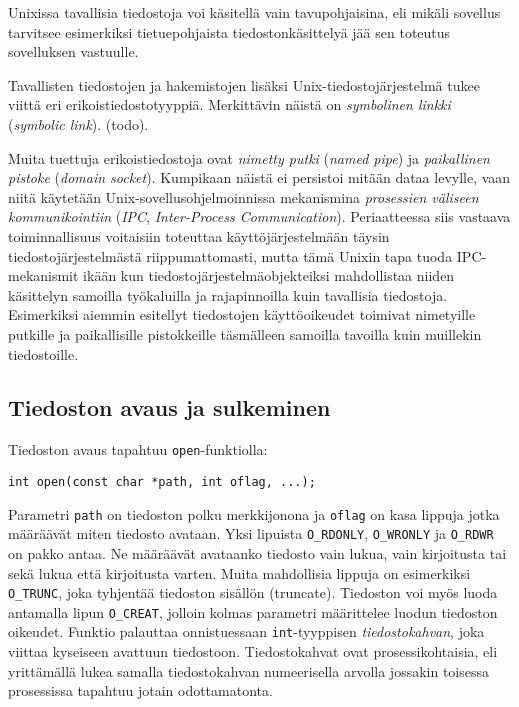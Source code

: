 Unixissa tavallisia tiedostoja voi käsitellä vain tavupohjaisina,
eli mikäli sovellus tarvitsee esimerkiksi tietuepohjaista tiedostonkäsittelyä jää sen toteutus sovelluksen vastuulle.

Tavallisten tiedostojen ja hakemistojen lisäksi Unix-tiedostojärjestelmä tukee viittä eri erikoistiedostotyyppiä.
Merkittävin näistä on \emph{symbolinen linkki} (\emph{symbolic link}). (todo).

Muita tuettuja erikoistiedostoja ovat \emph{nimetty putki} (\emph{named pipe}) ja \emph{paikallinen pistoke} (\emph{domain socket}).
Kumpikaan näistä ei persistoi mitään dataa levylle,
vaan niitä käytetään Unix-sovellusohjelmoinnissa mekanismina \emph{prosessien väliseen kommunikointiin} (\emph{IPC}, \emph{Inter-Process Communication}).
Periaatteessa siis vastaava toiminnallisuus voitaisiin toteuttaa käyttöjärjestelmään täysin tiedostojärjestelmästä riippumattomasti,
mutta tämä Unixin tapa tuoda IPC-mekanismit ikään kun tiedostojärjestelmäobjekteiksi mahdollistaa niiden käsittelyn samoilla työkaluilla ja rajapinnoilla kuin tavallisia tiedostoja.
Esimerkiksi aiemmin esitellyt tiedostojen käyttöoikeudet toimivat nimetyille putkille ja paikallisille pistokkeille täsmälleen samoilla tavoilla kuin muillekin tiedostoille.

\subsection{Tiedoston avaus ja sulkeminen}
Tiedoston avaus tapahtuu \texttt{open}-funktiolla:

\begin{verbatim}
int open(const char *path, int oflag, ...);
\end{verbatim}
%
Parametri \texttt{path} on tiedoston polku merkkijonona
ja \texttt{oflag} on kasa lippuja jotka määräävät miten tiedosto avataan.
Yksi lipuista \texttt{O\_RDONLY}, \texttt{O\_WRONLY} ja \texttt{O\_RDWR} on pakko antaa.
Ne määräävät avataanko tiedosto vain lukua, vain kirjoitusta tai sekä lukua että
kirjoitusta varten.
Muita mahdollisia lippuja on esimerkiksi \texttt{O\_TRUNC},
joka tyhjentää tiedoston sisällön (truncate).
Tiedoston voi myös luoda antamalla lipun \texttt{O\_CREAT},
jolloin kolmas parametri määrittelee luodun tiedoston oikeudet.
Funktio palauttaa onnistuessaan \texttt{int}-tyyppisen \emph{tiedostokahvan},
joka viittaa kyseiseen avattuun tiedostoon.
Tiedostokahvat ovat prosessikohtaisia,
eli yrittämällä lukea samalla tiedostokahvan numeerisella arvolla
jossakin toisessa prosessissa tapahtuu jotain odottamatonta.

